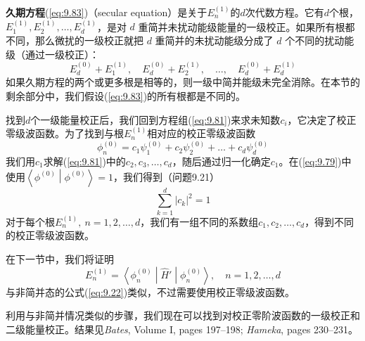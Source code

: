     \textbf{久期方程}(\ref{eq:9.83})（secular equation）是关于$E_n^{\left(1\right)}$的$d$次代数方程。它有$d$个根，$E_1^{\left(1\right)}, E_2^{\left(1\right)}, \ldots, E_d^{\left(1\right)}$，是对 $d$ 重简并未扰动能级能量的一级校正。如果所有根都不同，那么微扰的一级校正就把 $d$ 重简并的未扰动能级分成了 $d$ 个不同的扰动能级（通过一级校正）：
    \begin{equation*}
        E_d^{\left(0\right)} + E_1^{\left(1\right)}, \quad E_d^{\left(0\right)} + E_2^{\left(1\right)}, \quad \ldots, \quad E_d^{\left(0\right)} + E_d^{\left(1\right)}
    \end{equation*}
    如果久期方程的两个或更多根是相等的，则一级中简并能级未完全消除。在本节的剩余部分中，我们假设(\ref{eq:9.83})的所有根都是不同的。

    找到$d$个一级能量校正后，我们回到方程组(\ref{eq:9.81})来求未知数$c_i$，它决定了校正零级波函数。为了找到与根$E_n^{\left(1\right)}$相对应的校正零级波函数
    \begin{equation}
        \phi_n^{\left(0\right)} = c_1\psi_1^{\left(0\right)} + c_2\psi_2^{\left(0\right)} + \ldots + c_d\psi_d^{\left(0\right)}
        \label{eq:9.84}
    \end{equation}
    我们用$c_1$求解(\ref{eq:9.81})中的$c_2,c_3,\ldots,c_d$，随后通过归一化确定$c_1$。在(\ref{eq:9.79})中使用$\left\langle \phi^{\left(0\right)} \middle| \phi^{\left(0\right)} \right\rangle = 1$，我们得到（问题9.21）
    \begin{equation}
        \sum_{k=1}^{d}\left|c_k\right|^2 = 1
        \label{eq:9.85}
    \end{equation}
    对于每个根$E_n^{\left(1\right)}, \: n = 1,2,\ldots,d$，我们有一组不同的系数组$c_1, c_2, \ldots, c_d$，得到不同的校正零级波函数。

    在下一节中，我们将证明
    \begin{equation}
        E_n^{\left(1\right)} = \left\langle \phi_n^{\left(0\right)} \middle| \hat{H}' \middle| \phi_n^{\left(0\right)} \right\rangle, \quad n = 1,2,\ldots,d
        \label{eq:9.86}
    \end{equation}
    与非简并态的公式(\ref{eq:9.22})类似，不过需要使用校正零级波函数。

    利用与非简并情况类似的步骤，我们现在可以找到对校正零阶波函数的一级校正和二级能量校正。结果见\textit{Bates}, Volume I, pages 197–198; \textit{Hameka}, pages 230–231。

